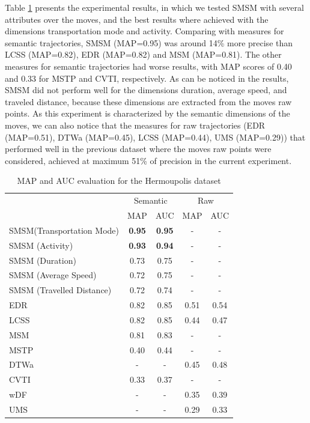 {Table {\ref{tab:hermoupolis_measures_map_auc}} presents the experimental results, in which we tested SMSM with several  attributes over the moves, and the best results where achieved with the dimensions transportation mode and activity. Comparing with measures for semantic trajectories, SMSM (MAP=0.95) was around 14\% more precise than LCSS (MAP=0.82), EDR (MAP=0.82) and MSM (MAP=0.81). The other measures for semantic trajectories had worse results, with MAP scores of 0.40 and 0.33 for MSTP and CVTI, respectively. As can be noticed in the results,  SMSM did not perform well for the dimensions duration, average speed, and traveled distance, because these dimensions are extracted from the moves raw points. As this experiment is characterized by the semantic dimensions of the moves, we can also notice that the measures for raw trajectories (EDR (MAP=0.51), DTWa (MAP=0.45), LCSS (MAP=0.44), UMS (MAP=0.29)) that performed well in the previous dataset where the moves raw points were considered, achieved at maximum 51\% of precision in the current experiment.}


\begin{table}[h]
\scriptsize
  \centering
  \begin{tabular}{|l|c|c|c|c|}
  \hline
 & \multicolumn{2}{c}{Semantic} & \multicolumn{2}{|c|}{Raw} \\
 	\cline{2-5}
 & MAP & AUC & MAP & AUC \\
  \hline
SMSM(Transportation Mode)& \textbf{0.95} & \textbf{0.95} & - & -\\
SMSM (Activity)& \textbf{0.93} & \textbf{0.94} & - & -\\
SMSM (Duration)& 0.73 & 0.75 & - & -\\
SMSM (Average Speed)& 0.72 & 0.75 & - & -\\
SMSM (Travelled Distance)& 0.72 & 0.74 & - & -\\
EDR & 0.82 & 0.85 & 0.51 & 0.54 \\
LCSS & 0.82 & 0.85 & 0.44 & 0.47 \\
MSM & 0.81 & 0.83 & - & - \\
MSTP & 0.40 & 0.44 & - & - \\
DTWa & - & - & 0.45 & 0.48 \\
CVTI & 0.33 & 0.37 & - & - \\
wDF & - & - & 0.35 & 0.39 \\
UMS & - & - & 0.29 & 0.33 \\
    \hline
  \end{tabular}
  \caption{MAP and AUC evaluation for the Hermoupolis dataset}
  \label{tab:hermoupolis_measures_map_auc}
\end{table}

